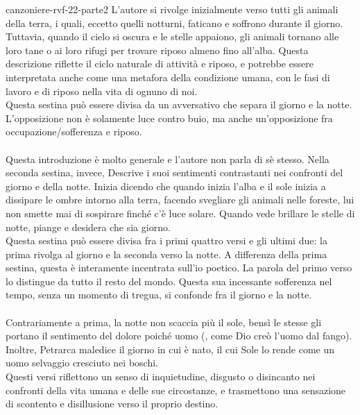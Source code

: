 \documentclass[preview]{standalone}
\begin{document}
\begin{snippet}{canzoniere-rvf-22-parte2}
     L'autore si rivolge inizialmente verso tutti gli animali della terra,
    i quali, eccetto quelli notturni, faticano e soffrono durante il giorno.
    Tuttavia, quando il cielo si oscura e le stelle appaiono,
    gli animali tornano alle loro tane o ai loro rifugi per trovare
    riposo almeno fino all'alba.
    Questa descrizione riflette il ciclo naturale di attività e riposo,
    e potrebbe essere interpretata anche come una metafora della condizione umana,
    con le fasi di lavoro e di riposo nella vita di ognuno di noi. \\
    Questa sestina può essere divisa da un  avversativo che separa il giorno e la notte.
    L'opposizione non è solamente luce contro buio, ma anche un'opposizione fra occupazione/sofferenza e riposo.
    \\\\
     Questa introduzione è molto generale e l'autore non parla di sè stesso.
    Nella seconda sestina, invece, Descrive i suoi sentimenti contrastanti nei confronti
    del giorno e della notte.
    Inizia dicendo che quando inizia l'alba e il sole inizia a dissipare
    le ombre intorno alla terra, facendo svegliare gli animali nelle foreste,
    lui non smette mai di sospirare finché c'è luce solare.
    Quando vede brillare le stelle di notte, piange e desidera che sia giorno. \\
    Questa sestina può essere divisa fra i primi quattro versi e gli ultimi due:
    la prima rivolga al giorno e la seconda verso la notte.
    A differenza della prima sestina, questa è interamente incentrata sull'io poetico.
    La parola  del primo verso lo distingue da tutto il resto del mondo.
    Questa sua incessante sofferenza nel tempo, senza un momento di tregua,
    si confonde fra il giorno e la notte.
    \\\\
     Contrariamente a prima, la notte non scaccia più il sole, bensì
    le stesse gli portano il sentimento del dolore poiché uomo (,
    come Dio creò l'uomo dal fango).
    Inoltre, Petrarca maledice il giorno in cui è nato, il cui Sole lo rende come un uomo selvaggio cresciuto nei boschi.
    \\
    Questi versi riflettono un senso di inquietudine,
    disgusto o disincanto nei confronti della vita umana e delle sue circostanze,
    e trasmettono una sensazione di scontento e disillusione verso il proprio destino.

\end{snippet}
\end{document}
